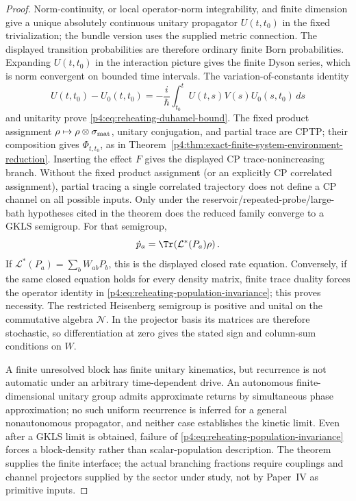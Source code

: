 \documentclass[12pt,a4paper]{article}
\begin{document}
\begin{proof}
Norm-continuity, or local operator-norm integrability, and finite dimension
give a unique absolutely continuous unitary propagator \(U(t,t_0)\) in the
fixed trivialization; the bundle version uses the supplied metric
connection.  The displayed transition probabilities are therefore ordinary
finite Born probabilities.  Expanding \(U(t,t_0)\) in the interaction picture
gives the finite Dyson series, which is norm convergent on bounded time
intervals.  The variation-of-constants identity
\[
U(t,t_0)-U_0(t,t_0)
=-\frac{i}{\hbar}\int_{t_0}^{t}
U(t,s)V(s)U_0(s,t_0)\,ds
\]
and unitarity prove \eqref{p4:eq:reheating-duhamel-bound}.  The fixed product assignment
\(\rho\mapsto\rho\otimes\sigma_{\rm mat}\), unitary conjugation, and partial
trace are CPTP; their composition gives \(\Phi_{t,t_0}\), as in
Theorem~\ref{p4:thm:exact-finite-system-environment-reduction}.  Inserting
the effect \(F\) gives the displayed CP trace-nonincreasing branch.  Without
the fixed product assignment (or an explicitly CP correlated assignment),
partial tracing a single correlated trajectory does not define a CP channel
on all possible inputs.  Only under the
reservoir/repeated-probe/large-bath hypotheses cited in the theorem does the
reduced family converge to a GKLS semigroup.  For that semigroup,
\[
\dot p_a
=\Tr\!\left(\mathcal L^*(P_a)\rho\right).
\]
If \(\mathcal L^*(P_a)=\sum_bW_{ab}P_b\), this is the displayed closed rate
equation.  Conversely, if the same closed equation holds for every density
matrix, finite trace duality forces the operator identity in
\eqref{p4:eq:reheating-population-invariance}; this proves necessity.  The
restricted Heisenberg semigroup is positive and unital on the commutative
algebra \(\mathcal N\).  In the projector basis its matrices are therefore
stochastic, so differentiation at zero gives the stated sign and
column-sum conditions on \(W\).

A finite unresolved block has finite unitary kinematics, but recurrence
is not automatic under an arbitrary time-dependent drive. An autonomous
finite-dimensional unitary group admits approximate returns by simultaneous
phase approximation; no such uniform recurrence is inferred for a general
nonautonomous propagator, and neither case establishes the kinetic limit.  Even after a GKLS limit is obtained, failure of
\eqref{p4:eq:reheating-population-invariance} forces a block-density rather
than scalar-population description.  The theorem supplies the finite
interface; the actual branching fractions require couplings and channel
projectors supplied by the sector under study, not by Paper~IV as primitive
inputs.
\end{proof}
\end{document}
